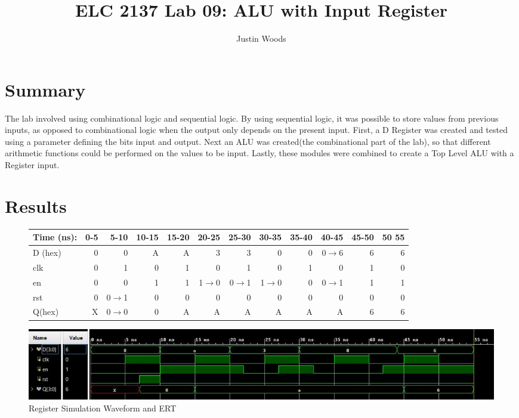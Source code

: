 \documentclass[11pt]{article}
\begin{document}
\title{ELC 2137 Lab 09: ALU with Input Register}
\author{Justin Woods}
\maketitle

\section*{Summary}
The lab involved using combinational logic and sequential logic. By using sequential logic, it was possible to store values from previous inputs, as opposed to combinational logic when the output only depends on the present input. First, a D Register was created and tested using a parameter defining the bits input and output. Next an ALU was created(the combinational part of the lab), so that different arithmetic functions could be performed on the values to be input. Lastly, these modules were combined to create a Top Level ALU with a Register input.

\section*{Results}

\begin{figure}[ht]\centering
	
	\begin{tabular}{l|rrrrrrrrrrr}	
		Time (ns): & 0-5 & 5-10 & 10-15 & 15-20 & 20-25 & 25-30 & 30-35 & 35-40 & 40-45 & 45-50 & 50 55 \\
		\midrule
		D (hex) & 0 & 0 	  & A & A & 3 	    & 3 	  & 0 	    & 0 & 0$\to$6 & 6 & 6 \\
		clk     & 0 & 1 	  & 0 & 1 & 0 	    & 1 	  & 0 	    & 1 & 0 	  & 1 & 0 \\
		en  	& 0 & 0 	  & 1 & 1 & 1$\to$0 & 0$\to$1 & 1$\to$0 & 0 & 0$\to$1 & 1 & 1 \\
		rst 	& 0 & 0$\to$1 & 0 & 0 & 0 		& 0 	  & 0		& 0 & 0		  & 0 & 0 \\
		\midrule
		Q(hex) 	& X & 0$\to$0 & 0 & A & A 		& A 	  & A 		& A & A 	  & 6 & 6 \\
		\bottomrule
	\end{tabular}
	\bigskip
	\includegraphics[width=1\textwidth,angle=0,origin=c]{registerWaveform}
	\caption{Register Simulation Waveform and ERT}
	\label{fig:sim_with_table}
\end{figure}
\end{document}
